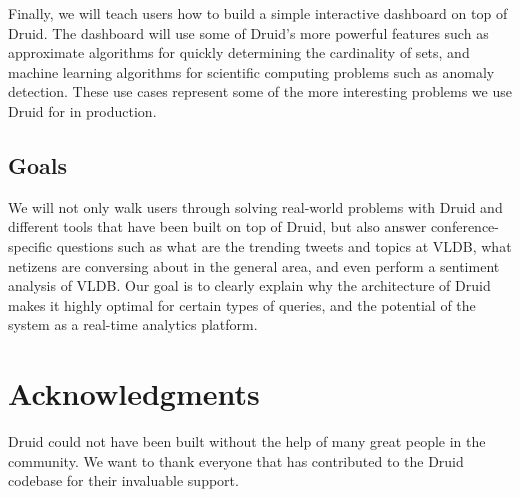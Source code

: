 \documentclass{vldb}
\begin{document}
Finally, we will teach users how to build a simple interactive dashboard on top
of Druid. The dashboard will use some of Druid's more powerful features such as
approximate algorithms for quickly determining the cardinality of sets, and
machine learning algorithms for scientific computing problems such as anomaly
detection.  These use cases represent some of the more interesting problems we
use Druid for in production.

\subsection{Goals}

We will not only walk users through solving real-world problems with Druid and
different tools that have been built on top of Druid, but also answer
conference-specific questions such as what are the trending tweets and topics
at VLDB, what netizens are conversing about in the general area, and even
perform a sentiment analysis of VLDB. Our goal is to clearly explain why the
architecture of Druid makes it highly optimal for certain types of queries, and
the potential of the system as a real-time analytics platform.


\balance

\section{Acknowledgments}
Druid could not have been built without the help of many great people in the
community.  We want to thank everyone that has contributed to the Druid
codebase for their invaluable support.


\end{document}
